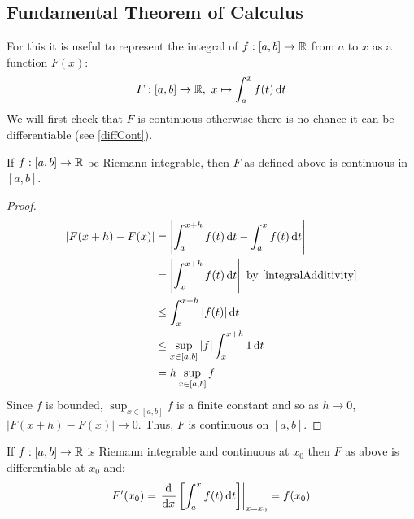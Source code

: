 \documentclass[../main.tex]{subfiles}
\begin{document}
\subsection{Fundamental Theorem of Calculus}
For this it is useful to represent the integral of $f: [a, b] \to \mathbb{R}$ from $a$ to $x$ as a function $F(x)$:
\[
  F: [a, b] \to \R,\ x \mapsto \int_{a}^{x} f(t) \d{t}
\]
We will first check that $F$ is continuous otherwise there is no chance it can be differentiable (see \cref{diffCont}).
\begin{proposition}
  If $f: [a, b] \to \mathbb{R}$ be Riemann integrable, then $F$ as defined above is continuous in $[a, b]$.
\end{proposition}
\begin{proof}
  \begin{align*}
    |F(x + h) - F(x)| &= \abs{\int_{a}^{x + h} f(t) \d{t} - \int_{a}^{x} f(t) \d{t}} \\
                      &= \abs{\int_{x}^{x + h} f(t) \d{t}} \text{ by \cref{integralAdditivity}}\\
                      &\leq \int_{x}^{x+h} |f(t)| \d{t} \\
                      &\leq \sup_{x \in [a, b]} |f| \int_{x}^{x+h} 1 \d{t} \\
                      &= h \sup_{x \in [a, b]} f
  \end{align*}
  Since $f$ is bounded, $\sup_{x \in [a, b]} f$ is a finite constant and so as $h \to 0$, $|F(x + h) - F(x)| \to 0$.
  Thus, $F$ is continuous on $[a, b]$.
\end{proof}
\begin{theorem}
  If $f: [a, b] \to \mathbb{R}$ is Riemann integrable and continuous at $x_0$ then $F$ as above is differentiable at $x_0$ and: \label{FTCDiff}
  \[
    F'(x_0) = \at{\deriv{}{x}\left[\int_{a}^{x} f(t) \d{t}\right]}{x = x_0}  = f(x_0)
  \]
\end{theorem}
\end{document}
